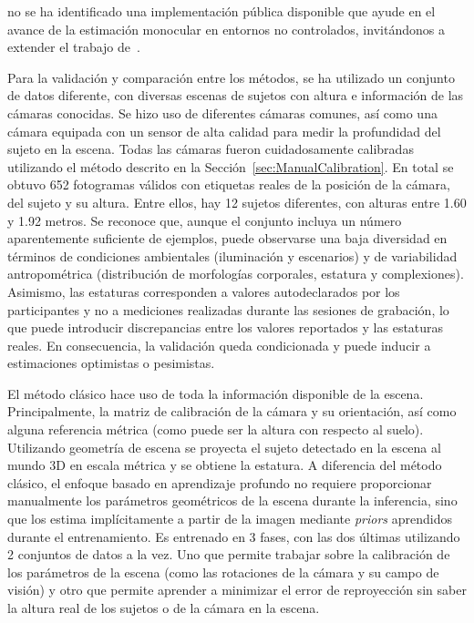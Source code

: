 no se ha identificado una implementación pública disponible que ayude en el avance de la estimación
monocular en entornos no controlados, invitándonos a extender el trabajo de~\cite{SVMIW}.
\par
Para la validación y comparación entre los métodos, se ha utilizado un conjunto de
datos diferente, con diversas escenas de sujetos con altura e información de las cámaras conocidas.
Se hizo uso de diferentes cámaras comunes, así como una cámara equipada con un sensor
de alta calidad para medir la profundidad del sujeto en la escena.
Todas las cámaras fueron cuidadosamente calibradas utilizando el método descrito
en la Sección~\ref{sec:ManualCalibration}.
En total se obtuvo 652 fotogramas válidos con etiquetas reales de la posición de la cámara, del sujeto y su altura.
Entre ellos, hay 12 sujetos diferentes, con alturas entre 1.60 y 1.92 metros.
Se reconoce que, aunque el conjunto incluya un número aparentemente suficiente de ejemplos,
puede observarse una baja diversidad en términos de condiciones ambientales (iluminación y escenarios) y de variabilidad antropométrica
(distribución de morfologías corporales, estatura y complexiones).
Asimismo, las estaturas corresponden a valores autodeclarados por los participantes y no a mediciones realizadas durante
las sesiones de grabación, lo que puede introducir discrepancias entre los valores reportados y las estaturas reales.
En consecuencia, la validación queda condicionada y puede inducir a estimaciones optimistas o pesimistas.
\par
El método clásico hace uso de toda la información disponible de la escena.
Principalmente, la matriz de calibración de la cámara y su orientación, así
como alguna referencia métrica (como puede ser la altura con respecto al suelo).
Utilizando geometría de escena se proyecta el sujeto detectado
en la escena al mundo 3D en escala métrica y se obtiene la estatura.
A diferencia del método clásico, el enfoque basado en aprendizaje profundo no requiere proporcionar
manualmente los parámetros geométricos de la escena durante la inferencia, sino que los estima
implícitamente a partir de la imagen mediante \emph{priors} aprendidos durante el entrenamiento.
Es entrenado en 3 fases, con las dos últimas utilizando 2 conjuntos de datos a
la vez. Uno que permite trabajar sobre la calibración de los parámetros de la escena
(como las rotaciones de la cámara y su campo de visión) y otro que permite aprender
a minimizar el error de reproyección sin saber la altura real de los sujetos o de la cámara en la escena.
\par
